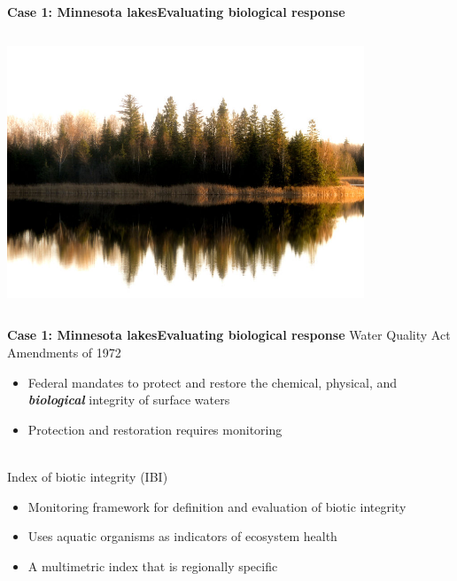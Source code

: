 \documentclass[serif]{beamer}\usepackage[]{graphicx}\usepackage[]{color}
\newcommand{\emtxt}[1]{\textbf{\textit{#1}}}
\begin{document}
\begin{frame}{\textbf{Case 1: Minnesota lakes}}{\textbf{Evaluating biological response}}
\begin{columns}
\begin{column}{0.5\textwidth}
\begin{center}
\includegraphics[width=0.8\textwidth]{fig/mn_lake.jpg}
\end{center}
\end{column}
\end{columns}
\end{frame}

\begin{frame}{\textbf{Case 1: Minnesota lakes}}{\textbf{Evaluating biological response}}
\onslide<+->
Water Quality Act Amendments of 1972
\begin{itemize}
\item{Federal mandates to protect and restore the chemical, physical, and \emtxt{biological} integrity of surface waters}
\item{Protection and restoration requires monitoring \\~\\}
\end{itemize}
\onslide<+->
Index of biotic integrity (IBI) \cite{Karr81,Karr86}
\begin{itemize}
\item{Monitoring framework for definition and evaluation of biotic integrity}
\item{Uses aquatic organisms as indicators of ecosystem health}
\item{A multimetric index that is regionally specific}
\end{itemize}
\end{frame}
\end{document}
